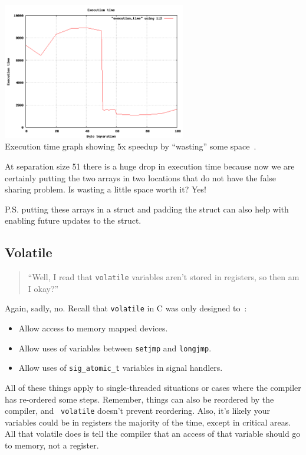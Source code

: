 \begin{center}
\includegraphics[width=0.6\textwidth]{images/falsesharing.png}\\
Execution time graph showing 5x speedup by ``wasting'' some space~\cite{falsesharing}.
\end{center}

At separation size 51 there is a huge drop in execution time because now we are certainly putting the two arrays in two locations that do not have the false sharing problem. Is wasting a little space worth it? Yes!

P.S. putting these arrays in a struct and padding the struct can also help with enabling future updates to the struct.

\subsection*{Volatile}

\begin{quote}
``Well, I read that {\tt volatile} variables aren't stored in registers,
    so then am I okay?''
\end{quote}

Again, sadly, no. Recall that {\tt volatile} in C was only designed to~\cite{pr:volatile}:
      \begin{itemize}
        \item Allow access to memory mapped devices.
        \item Allow uses of variables between {\tt setjmp} and {\tt longjmp}.
        \item Allow uses of {\tt sig\_atomic\_t} variables in signal handlers.
      \end{itemize}

All of these things apply to single-threaded situations or cases where the compiler has re-ordered some steps. Remember, things can also be reordered by the compiler, and {\tt
  volatile} doesn't prevent reordering. Also, it's likely your
variables could be in registers the majority of the time, except in
critical areas. All that volatile does is tell the compiler that an access of that variable should go to memory, not a register.




